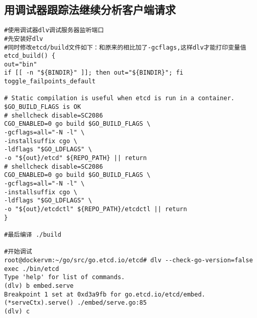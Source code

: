 \subsection{用调试器跟踪法继续分析客户端请求}
\begin{verbatim}
#使用调试器dlv调试服务器监听端口
#先安装好dlv
#同时修改etcd/build文件如下：和原来的相比加了-gcflags,这样dlv才能打印变量值
etcd_build() {
out="bin"
if [[ -n "${BINDIR}" ]]; then out="${BINDIR}"; fi
toggle_failpoints_default

# Static compilation is useful when etcd is run in a container. $GO_BUILD_FLAGS is OK
# shellcheck disable=SC2086
CGO_ENABLED=0 go build $GO_BUILD_FLAGS \
-gcflags=all="-N -l" \
-installsuffix cgo \
-ldflags "$GO_LDFLAGS" \
-o "${out}/etcd" ${REPO_PATH} || return
# shellcheck disable=SC2086
CGO_ENABLED=0 go build $GO_BUILD_FLAGS \
-gcflags=all="-N -l" \
-installsuffix cgo \
-ldflags "$GO_LDFLAGS" \
-o "${out}/etcdctl" ${REPO_PATH}/etcdctl || return
}

#最后编译 ./build

#开始调试
root@dockervm:~/go/src/go.etcd.io/etcd# dlv --check-go-version=false exec ./bin/etcd
Type 'help' for list of commands.
(dlv) b embed.serve
Breakpoint 1 set at 0xd3a9fb for go.etcd.io/etcd/embed.(*serveCtx).serve() ./embed/serve.go:85
(dlv) c

\end{verbatim}